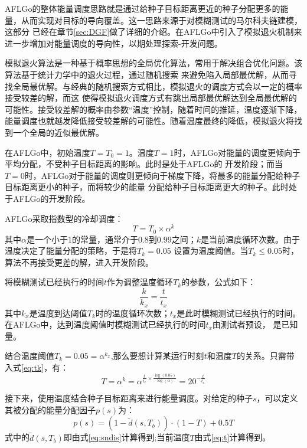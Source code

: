 \documentclass[bachelor]{njupthesis}
\begin{document}
AFLGo的整体能量调度思路就是通过给种子目标距离更近的种子分配更多的能量，从而实现对目标的导向覆盖。这一思路来源于对模糊测试的马尔科夫链建模，这部分
已经在章节\ref{sec:DGF}做了详细的介绍。在AFLGo中引入了模拟退火机制来进一步增加对能量调度的导向性，以期处理探索-开发问题。

模拟退火算法是一种基于概率思想的全局优化算法，常用于解决组合优化问题。该算法基于统计力学中的退火过程，通过随机搜索
来避免陷入局部最优解，从而寻找全局最优解。与经典的随机搜索方式相比，模拟退火的调度方式会以一定的概率接受较差的解，而这
使得模拟退火调度方式有跳出局部最优解达到全局最优解的可能性。接受较差解的概率由参数“温度”控制，随着时间的推延，温度逐渐下降，
能量调度也就越发降低接受较差解的可能性。随着温度最终的降低，模拟退火将找到一个全局的近似最优解。

在AFLGo中，初始温度$T=T_0=1$。温度$T=1$时，AFLGo对能量的调度更倾向于平均分配，不受种子目标距离的影响。此时是处于AFLGo的
开发阶段；而当$T=0$时，AFLGo对于能量的调度则更倾向于梯度下降，将最多的能量分配给种子目标距离更小的种子，而将较少的能量
分配给种子目标距离更大的种子。此时处于AFLGo的开发阶段。

AFLGo采取指数型的冷却调度：
\begin{equation}
	T=T_0 \times \alpha^k	
\end{equation}
其中$\alpha$是一个小于1的常量，通常介于0.8到0.99之间；$k$是当前温度循环次数。由于温度决定了能量分配的策略，于是将$T_k=0.05$
设置为温度阈值。当$T_k \leq 0.05$时，算法不再接受更差的解，进入开发阶段。

将模糊测试已经执行的时间$t$作为调整温度循环$T_k$的参数，公式如下：
\begin{equation}\label{eq:tk}
	\frac{k}{k_x}=\frac{t}{t_x}	
\end{equation}
其中$k_x$是温度到达阈值$T_k$时的温度循环次数；$t_x$是此时模糊测试已经执行的时间。在AFLGo中，达到温度阈值时模糊测试已经执行的时间$t_x$由测试者预设，
是已知量。

结合温度阈值$T_k=0.05=\alpha^{k_x}$,那么要想计算某运行时刻$t$和温度$T$的关系。只需带入式\ref{eq:tk}，有：
\begin{equation}\label{eq:t}
	T=\alpha^k=\alpha^{\frac{t}{t_x}\times\frac{\log(0.05)}{\log(\alpha)}}=20^{-\frac{t}{t_x}}
\end{equation}

接下来，使用温度结合种子目标距离来进行能量调度。对给定的种子$s$，可以定义其被分配的能量分配因子$p(s)$为：
\begin{equation}\label{eq:energy}
	p(s)=(1-\widetilde{d}(s,T_b))\cdot(1-T)+0.5T
\end{equation}
式中的$\widetilde{d}(s,T_b)$即由式\ref{eq:sndis}计算得到;当前温度$T$由式\ref{eq:t}计算得到。
\end{document}
